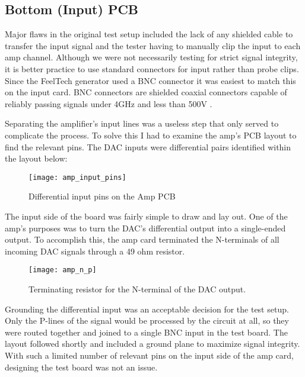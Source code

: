 \subsection{Bottom (Input) PCB}
Major flaws in the original test setup included the lack of any shielded cable to transfer the input signal and the tester having to manually clip the input to each amp channel. Although we were not necessarily testing for strict signal integrity, it is better practice to use standard connectors for input rather than probe clips. Since the FeelTech generator used a BNC connector it was easiest to match this on the input card. BNC connectors are shielded coaxial connectors capable of reliably passing signals under 4GHz and less than 500V \cite{bncbook}. \par
Separating the amplifier's input lines was a useless step that only served to complicate the process. To solve this I had to examine the amp's PCB layout to find the relevant pins. The DAC inputs were differential pairs identified within the layout below:
\begin{figure}[!htb]
	\centering
	\texttt{[image: amp\_input\_pins]}
	\caption{Differential input pins on the Amp PCB}
\end{figure}
The input side of the board was fairly simple to draw and lay out. One of the amp's purposes was to turn the DAC's differential output into a single-ended output. To accomplish this, the amp card terminated the N-terminals of all incoming DAC signals through a 49 ohm resistor.
\begin{figure}[!htb]
	\centering
	\texttt{[image: amp\_n\_p]}
	\caption{Terminating resistor for the N-terminal of the DAC output.}
\end{figure}
Grounding the differential input was an acceptable decision for the test setup. Only the P-lines of the signal would be processed by the circuit at all, so they were routed together and joined to a single BNC input in the test board.
The layout followed shortly and included a ground plane to maximize signal integrity. With such a limited number of relevant pins on the input side of the amp card, designing the test board was not an issue. \par
